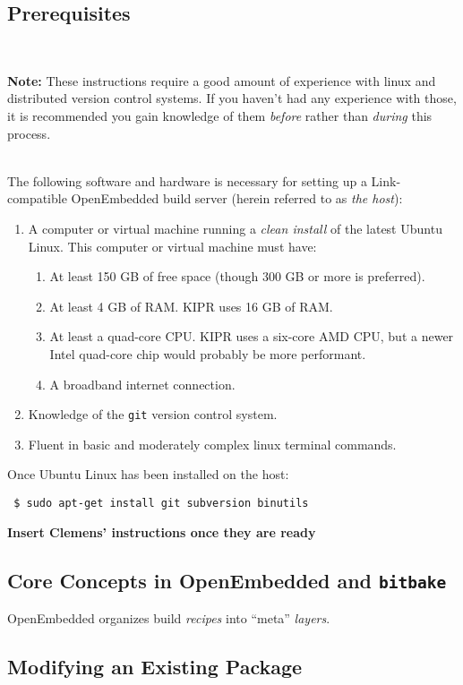 \documentclass[12pt,letterpaper]{article}
\newcommand{\bcolorbox}[4]{\noindent \\ \fcolorbox{#1}{#2} {\parbox{\textwidth}{\vspace{.1em}\textbf{#3} #4\vspace{.1em}}} \\}
\newcommand{\note}[1]{\bcolorbox{yellow}{Seashell}{Note:}{#1}}
\begin{document}
	\subsection{Prerequisites}
	\note{These instructions require a good amount of experience with linux and distributed version control systems. If you haven't had
	any experience with those, it is recommended you gain knowledge of them \emph{before} rather than \emph{during} this process.}
	
	The following software and hardware is necessary for setting up a Link-compatible OpenEmbedded build server (herein referred to as
	\emph{the host}):
	
	\begin{enumerate}
		\setlength{\itemsep}{0em}
		\item A computer or virtual machine running a \emph{clean install} of the latest Ubuntu Linux. This computer or virtual machine must have:
		\begin{enumerate}
			\setlength{\itemsep}{0em}
			\item At least 150 GB of free space (though 300 GB or more is preferred).
			\item At least 4 GB of RAM. KIPR uses 16 GB of RAM.
			\item At least a quad-core CPU. KIPR uses a six-core AMD CPU, but a newer Intel quad-core
			chip would probably be more performant.
			\item A broadband internet connection.
		\end{enumerate}
		\item Knowledge of the \texttt{git} version control system.
		\item Fluent in basic and moderately complex linux terminal commands.
	\end{enumerate}
	
	Once Ubuntu Linux has been installed on the host:
	
	\texttt{
\$ sudo apt-get install git subversion binutils
	}
	
	\textbf{Insert Clemens' instructions once they are ready}
	
	\subsection{Core Concepts in OpenEmbedded and \texttt{bitbake}}
	OpenEmbedded organizes build \emph{recipes} into ``meta'' \emph{layers}. 
	
	\subsection{Modifying an Existing Package}
	
\end{document}
